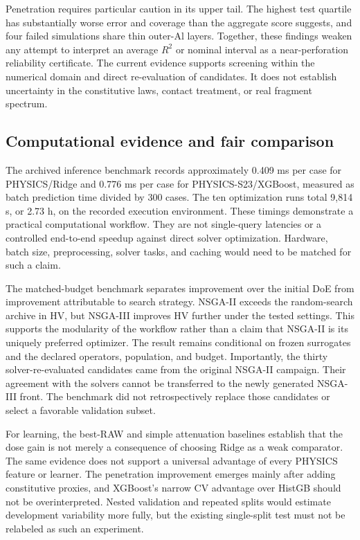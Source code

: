 \documentclass[12pt]{elsarticle}
\begin{document}
Penetration requires particular caution in its upper tail. The highest test quartile has substantially worse error and coverage than the aggregate score suggests, and four failed simulations share thin outer-Al layers. Together, these findings weaken any attempt to interpret an average $R^2$ or nominal interval as a near-perforation reliability certificate. The current evidence supports screening within the numerical domain and direct re-evaluation of candidates. It does not establish uncertainty in the constitutive laws, contact treatment, or real fragment spectrum.

\subsection{Computational evidence and fair comparison}
The archived inference benchmark records approximately 0.409 ms per case for PHYSICS/Ridge and 0.776 ms per case for PHYSICS-S23/XGBoost, measured as batch prediction time divided by 300 cases. The ten optimization runs total 9,814 s, or 2.73 h, on the recorded execution environment. These timings demonstrate a practical computational workflow. They are not single-query latencies or a controlled end-to-end speedup against direct solver optimization. Hardware, batch size, preprocessing, solver tasks, and caching would need to be matched for such a claim.

The matched-budget benchmark separates improvement over the initial DoE from improvement attributable to search strategy. NSGA-II exceeds the random-search archive in HV, but NSGA-III improves HV further under the tested settings. This supports the modularity of the workflow rather than a claim that NSGA-II is its uniquely preferred optimizer. The result remains conditional on frozen surrogates and the declared operators, population, and budget. Importantly, the thirty solver-re-evaluated candidates came from the original NSGA-II campaign. Their agreement with the solvers cannot be transferred to the newly generated NSGA-III front. The benchmark did not retrospectively replace those candidates or select a favorable validation subset.

For learning, the best-RAW and simple attenuation baselines establish that the dose gain is not merely a consequence of choosing Ridge as a weak comparator. The same evidence does not support a universal advantage of every PHYSICS feature or learner. The penetration improvement emerges mainly after adding constitutive proxies, and XGBoost's narrow CV advantage over HistGB should not be overinterpreted. Nested validation and repeated splits would estimate development variability more fully, but the existing single-split test must not be relabeled as such an experiment.
\end{document}

